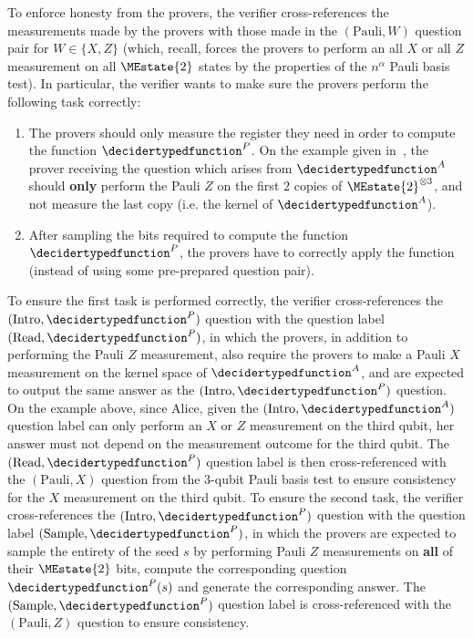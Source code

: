 To enforce honesty from the provers, the verifier cross-references the measurements made by the provers with those made in the $(\text{Pauli}, W)$ question pair for $W \in \{X,Z\}$ (which, recall, forces the provers to perform an all $X$ or all $Z$ measurement on all $\MEstate{2}$ states by the properties of the $n^{\alpha}$ Pauli basis test). In particular, the verifier wants to make sure the provers perform the following task correctly:
\begin{enumerate}
	\item The provers should only measure the register they need in order to compute the function $\decidertypedfunction^{P}$. On the example given in~, the prover receiving the question which arises from $\decidertypedfunction^{A}$ should \textbf{only} perform the Pauli $Z$ on the first $2$ copies of $\MEstate{2}^{\otimes 3}$, and not measure the last copy (i.e. the kernel of $\decidertypedfunction^{A}$). 
	\item After sampling the bits required to compute the function $\decidertypedfunction^{P}$, the provers have to correctly apply the function (instead of using some pre-prepared question pair). 
\end{enumerate}
To ensure the first task is performed correctly, the verifier cross-references the $(\text{Intro}, \decidertypedfunction^{P})$ question with the question label $(\text{Read},  \decidertypedfunction^{P})$, in which the provers, in addition to performing the Pauli $Z$ measurement, also require the provers to make a Pauli $X$ measurement on the kernel space of $\decidertypedfunction^{A}$, and are expected to output the same answer as the $(\text{Intro}, \decidertypedfunction^{P})$ question. On the example above, since Alice, given the $(\text{Intro}, \decidertypedfunction^{A})$ question label can only perform an $X$ or $Z$ measurement on the third qubit, her answer must not depend on the measurement outcome for the third qubit. The $(\text{Read},  \decidertypedfunction^{P})$ question label is then cross-referenced with the $(\text{Pauli}, X)$ question from the $3$-qubit Pauli basis test to ensure consistency for the $X$ measurement on the third qubit.
To ensure the second task, the verifier cross-references the $(\text{Intro}, \decidertypedfunction^{P})$ question with the question label $(\text{Sample}, \decidertypedfunction^{P})$, in which the provers are expected to sample the entirety of the seed $s$ by performing Pauli $Z$ measurements on \textbf{all} of their $\MEstate{2}$ bits, compute the corresponding question $\decidertypedfunction^{P}(s)$ and generate the corresponding answer. The $(\text{Sample}, \decidertypedfunction^{P})$  question label is cross-referenced with the $(\text{Pauli}, Z)$ question to ensure consistency. 

